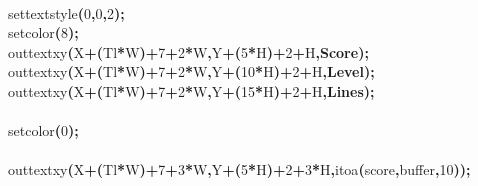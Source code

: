 \documentclass[a4paper, 10pt]{article}
\newcommand\SPC{\hspace*{0.6em}}
\newcommand\QOT{\mbox{\char 34}}
\newcommand{\CppAIdentifier}[1]{#1}
\newcommand{\CppANumber}[1]{\textcolor[rgb]{0.5,0,0.5}{#1}}
\newcommand{\CppASpace}[1]{\colorbox[rgb]{1,1,1}{#1}}
\newcommand{\CppAString}[1]{\textbf{\textcolor[rgb]{0,0,1}{#1}}}
\newcommand{\CppASymbol}[1]{\textbf{\textcolor[rgb]{1,0,0}{#1}}}
\begin{document}
\begin{ttfamily}
\\
\CppASpace{\SPC \SPC \SPC \SPC \SPC \SPC \SPC }\CppAIdentifier{settextstyle}\CppASymbol{(}\CppANumber{0}\CppASymbol{,}\CppANumber{0}\CppASymbol{,}\CppANumber{2}\CppASymbol{)}\CppASymbol{;}\\
\CppASpace{\SPC \SPC \SPC \SPC \SPC \SPC \SPC }\CppAIdentifier{setcolor}\CppASymbol{(}\CppANumber{8}\CppASymbol{)}\CppASymbol{;}\\
\CppASpace{\SPC \SPC \SPC \SPC \SPC \SPC \SPC }\CppAIdentifier{outtextxy}\CppASymbol{(}\CppAIdentifier{X}\CppASymbol{+}\CppASymbol{(}\CppAIdentifier{Tl}\CppASymbol{*}\CppAIdentifier{W}\CppASymbol{)}\CppASymbol{+}\CppANumber{7}\CppASymbol{+}\CppANumber{2}\CppASymbol{*}\CppAIdentifier{W}\CppASymbol{,}\CppAIdentifier{Y}\CppASymbol{+}\CppASymbol{(}\CppANumber{5}\CppASymbol{*}\CppAIdentifier{H}\CppASymbol{)}\CppASymbol{+}\CppANumber{2}\CppASymbol{+}\CppAIdentifier{H}\CppASymbol{,}\CppAString{\QOT Score\QOT }\CppASymbol{)}\CppASymbol{;}\\
\CppASpace{\SPC \SPC \SPC \SPC \SPC \SPC \SPC }\CppAIdentifier{outtextxy}\CppASymbol{(}\CppAIdentifier{X}\CppASymbol{+}\CppASymbol{(}\CppAIdentifier{Tl}\CppASymbol{*}\CppAIdentifier{W}\CppASymbol{)}\CppASymbol{+}\CppANumber{7}\CppASymbol{+}\CppANumber{2}\CppASymbol{*}\CppAIdentifier{W}\CppASymbol{,}\CppAIdentifier{Y}\CppASymbol{+}\CppASymbol{(}\CppANumber{10}\CppASymbol{*}\CppAIdentifier{H}\CppASymbol{)}\CppASymbol{+}\CppANumber{2}\CppASymbol{+}\CppAIdentifier{H}\CppASymbol{,}\CppAString{\QOT Level\QOT }\CppASymbol{)}\CppASymbol{;}\\
\CppASpace{\SPC \SPC \SPC \SPC \SPC \SPC \SPC }\CppAIdentifier{outtextxy}\CppASymbol{(}\CppAIdentifier{X}\CppASymbol{+}\CppASymbol{(}\CppAIdentifier{Tl}\CppASymbol{*}\CppAIdentifier{W}\CppASymbol{)}\CppASymbol{+}\CppANumber{7}\CppASymbol{+}\CppANumber{2}\CppASymbol{*}\CppAIdentifier{W}\CppASymbol{,}\CppAIdentifier{Y}\CppASymbol{+}\CppASymbol{(}\CppANumber{15}\CppASymbol{*}\CppAIdentifier{H}\CppASymbol{)}\CppASymbol{+}\CppANumber{2}\CppASymbol{+}\CppAIdentifier{H}\CppASymbol{,}\CppAString{\QOT Lines\QOT }\CppASymbol{)}\CppASymbol{;}\\
\\
\CppASpace{\SPC \SPC \SPC \SPC \SPC \SPC \SPC }\CppAIdentifier{setcolor}\CppASymbol{(}\CppANumber{0}\CppASymbol{)}\CppASymbol{;}\\
\\
\CppASpace{\SPC \SPC \SPC \SPC \SPC \SPC \SPC }\CppAIdentifier{outtextxy}\CppASymbol{(}\CppAIdentifier{X}\CppASymbol{+}\CppASymbol{(}\CppAIdentifier{Tl}\CppASymbol{*}\CppAIdentifier{W}\CppASymbol{)}\CppASymbol{+}\CppANumber{7}\CppASymbol{+}\CppANumber{3}\CppASymbol{*}\CppAIdentifier{W}\CppASymbol{,}\CppAIdentifier{Y}\CppASymbol{+}\CppASymbol{(}\CppANumber{5}\CppASymbol{*}\CppAIdentifier{H}\CppASymbol{)}\CppASymbol{+}\CppANumber{2}\CppASymbol{+}\CppANumber{3}\CppASymbol{*}\CppAIdentifier{H}\CppASymbol{,}\CppAIdentifier{itoa}\CppASymbol{(}\CppAIdentifier{score}\CppASymbol{,}\CppAIdentifier{buffer}\CppASymbol{,}\CppANumber{10}\CppASymbol{)}\CppASymbol{)}\CppASymbol{;}\\

\end{ttfamily}
\end{document}
